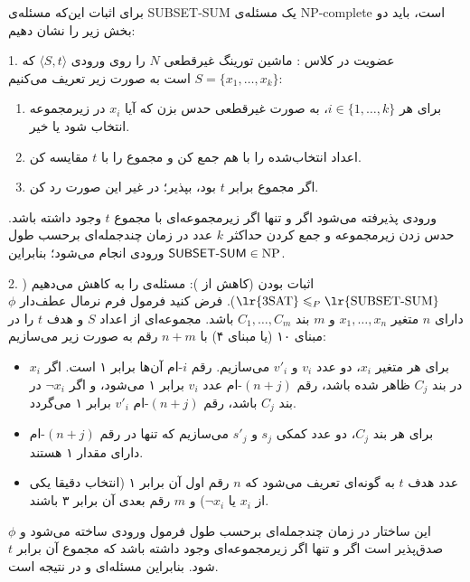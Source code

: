 
برای اثبات این‌که مسئله‌ی \textsf{SUBSET-SUM} یک مسئله‌ی NP-complete است، باید دو بخش زیر را نشان دهیم:

{1. عضویت در کلاس :}
ماشین تورینگ غیرقطعی $N$ را روی ورودی $\langle S, t \rangle$ که $S = \{x_1, \dots, x_k\}$ است به صورت زیر تعریف می‌کنیم:
\begin{enumerate}
    \item برای هر $i \in \{1, \dots, k\}$، به صورت غیرقطعی حدس بزن که آیا $x_i$ در زیرمجموعه انتخاب شود یا خیر.
    \item اعداد انتخاب‌شده را با هم جمع کن و مجموع را با $t$ مقایسه کن.
    \item اگر مجموع برابر $t$ بود، {بپذیر}؛ در غیر این صورت {رد کن}.
\end{enumerate}
ورودی پذیرفته می‌شود اگر و تنها اگر زیرمجموعه‌ای با مجموع $t$ وجود داشته باشد. حدس زدن زیرمجموعه و جمع کردن حداکثر $k$ عدد در زمان چندجمله‌ای برحسب طول ورودی انجام می‌شود؛ بنابراین $\text{\textsf{SUBSET-SUM}} \in \text{NP}$.

{2. اثبات  بودن (کاهش از ):}
مسئله‌ی  را به  کاهش می‌دهیم ($\text{\lr{3SAT}} \le_P \text{\lr{SUBSET-SUM}}$).
فرض کنید فرمول فرم نرمال عطف‌دار $\phi$ دارای $n$ متغیر $x_1, \dots, x_n$ و $m$ بند $C_1, \dots, C_m$ باشد.
مجموعه‌ای از اعداد $S$ و هدف $t$ را در مبنای ۱۰ (یا مبنای ۴) با $n+m$ رقم به صورت زیر می‌سازیم:
\begin{itemize}
    \item برای هر متغیر $x_i$، دو عدد $v_i$ و $v'_i$ می‌سازیم. رقم $i$-ام آن‌ها برابر ۱ است. اگر $x_i$ در بند $C_j$ ظاهر شده باشد، رقم $(n+j)$-ام عدد $v_i$ برابر ۱ می‌شود، و اگر $\neg x_i$ در بند $C_j$ باشد، رقم $(n+j)$-ام $v'_i$ برابر ۱ می‌گردد.
    \item برای هر بند $C_j$، دو عدد کمکی $s_j$ و $s'_j$ می‌سازیم که تنها در رقم $(n+j)$-ام دارای مقدار ۱ هستند.
    \item عدد هدف $t$ به گونه‌ای تعریف می‌شود که $n$ رقم اول آن برابر ۱ (انتخاب دقیقا یکی از $x_i$ یا $\neg x_i$) و $m$ رقم بعدی آن برابر ۳ باشند.
\end{itemize}
این ساختار در زمان چندجمله‌ای برحسب طول فرمول ورودی ساخته می‌شود و $\phi$ صدق‌پذیر است اگر و تنها اگر زیرمجموعه‌ای وجود داشته باشد که مجموع آن برابر $t$ شود.
بنابراین  مسئله‌ای  و در نتیجه {} است.

\pagebreak



